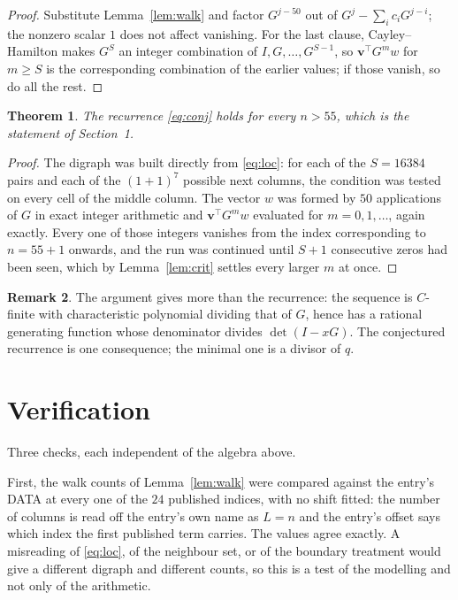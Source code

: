 \documentclass[11pt,a4paper]{article}
\theoremstyle{plain}
\newtheorem{theorem}{Theorem}
\theoremstyle{definition}
\newtheorem{remark}[theorem]{Remark}
\begin{document}
\begin{proof}
Substitute Lemma~\ref{lem:walk} and factor $G^{j-50}$ out of
$G^{j}-\sum_ic_iG^{j-i}$; the nonzero scalar $1$ does not affect
vanishing. For the last clause, Cayley--Hamilton makes $G^{S}$ an integer combination of
$I,G,\dots,G^{S-1}$, so $\mathbf{v}^{\!\top}G^{m}w$ for $m\ge S$ is the corresponding
combination of the earlier values; if those vanish, so do all the rest.
\end{proof}

\begin{theorem}
The recurrence \eqref{eq:conj} holds for every $n>55$, which is the statement of
Section~1.
\end{theorem}

\begin{proof}
The digraph was built directly from \eqref{eq:loc}: for each of the $S=16384$ pairs and each
of the $(1+1)^{7}$ possible next columns, the condition was tested on every cell of
the middle column. The vector $w$ was formed by $50$ applications of $G$ in exact integer
arithmetic and $\mathbf{v}^{\!\top}G^{m}w$ evaluated for $m=0,1,\dots$, again exactly.
Every one of those integers vanishes from the index corresponding to $n=55+1$ onwards,
and the run was continued until $S+1$ consecutive zeros had been seen, which by
Lemma~\ref{lem:crit} settles every larger $m$ at once.
\end{proof}

\begin{remark}
The argument gives more than the recurrence: the sequence is $C$-finite with characteristic
polynomial dividing that of $G$, hence has a rational generating function whose denominator
divides $\det(I-xG)$. The conjectured recurrence is one consequence; the minimal one is a
divisor of $q$.
\end{remark}

\section{Verification}

Three checks, each independent of the algebra above.

First, the walk counts of Lemma~\ref{lem:walk} were compared against the entry's DATA at
every one of the $24$ published indices, with no shift fitted: the number of columns is
read off the entry's own name as $L=n$ and the entry's offset says which index the first
published term carries. The values agree exactly. A misreading of \eqref{eq:loc}, of the
neighbour set, or of the boundary treatment would give a different digraph and different
counts, so this is a test of the modelling and not only of the arithmetic.
\end{document}
